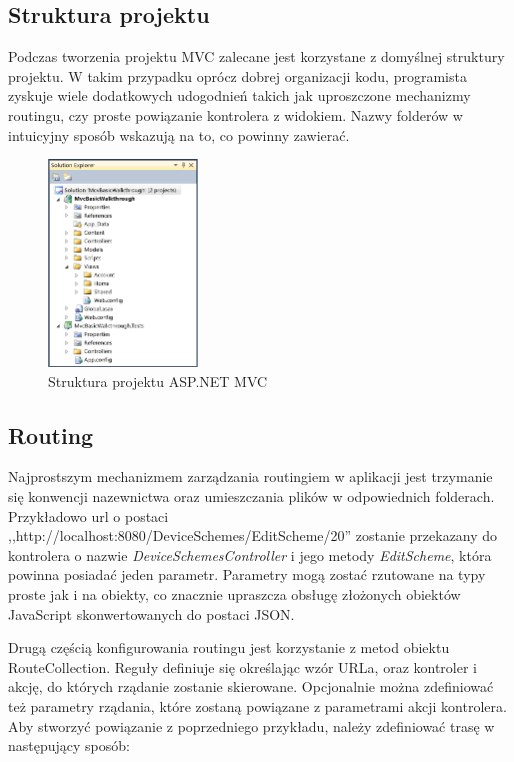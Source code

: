 \subsection{Struktura projektu}
Podczas tworzenia projektu MVC zalecane jest korzystane z domyślnej struktury projektu. W takim przypadku oprócz dobrej organizacji kodu, programista zyskuje wiele dodatkowych udogodnień takich jak uproszczone mechanizmy routingu, czy proste powiązanie kontrolera z widokiem. Nazwy folderów w intuicyjny sposób wskazują na to, co powinny zawierać. 

\begin{figure}[h]
	\includegraphics[height=55mm]{./img/mvc-project-structure.png}
	\caption{Struktura projektu ASP.NET MVC}
	\label{fig:mvc-project-structure}
\end{figure}

\subsection{Routing}
Najprostszym mechanizmem zarządzania routingiem w aplikacji jest trzymanie się konwencji nazewnictwa oraz umieszczania plików w odpowiednich folderach. Przykładowo url o postaci ,,http://localhost:8080/DeviceSchemes/EditScheme/20'' zostanie przekazany do kontrolera o nazwie \textit{DeviceSchemesController} i jego metody \textit{EditScheme}, która powinna posiadać jeden parametr. Parametry mogą zostać rzutowane na typy proste jak i na obiekty, co znacznie upraszcza obsługę złożonych obiektów JavaScript skonwertowanych do postaci JSON. 

Drugą częścią konfigurowania routingu jest korzystanie z metod obiektu RouteCollection. Reguły definiuje się określając wzór URLa, oraz kontroler i akcję, do których rządanie zostanie skierowane. Opcjonalnie można zdefiniować też parametry rządania, które zostaną powiązane z parametrami akcji kontrolera. Aby stworzyć powiązanie z poprzedniego przykładu, należy zdefiniować trasę w następujący sposób:

